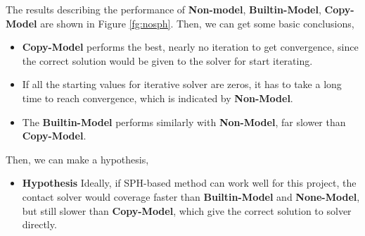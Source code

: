     The results describing the performance of \textbf{Non-model}, \textbf{Builtin-Model}, \textbf{Copy-Model} are shown in Figure \ref{fg:nosph}. Then, we can get some basic conclusions,
    \begin{itemize}
        \item \textbf{Copy-Model} performs the best, nearly no iteration to get convergence, since the correct solution would be given to the solver for start iterating.
        \item If all the starting values for iterative solver are zeros, it has to take a long time to reach convergence, which is indicated by \textbf{Non-Model}.
        \item The \textbf{Builtin-Model} performs similarly with \textbf{Non-Model}, far slower than \textbf{Copy-Model}.
    \end{itemize}
    Then, we can make a hypothesis,
    \begin{itemize}
        \item \textbf{Hypothesis} Ideally, if SPH-based method can work well for this project, the contact solver would coverage faster than \textbf{Builtin-Model} and \textbf{None-Model}, but still slower than \textbf{Copy-Model}, which give the correct solution to solver directly.
    \end{itemize}

